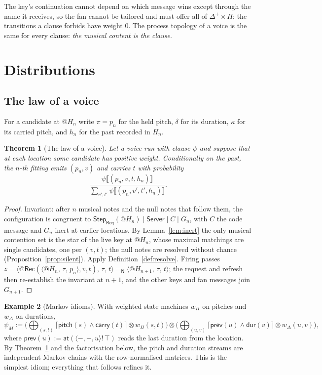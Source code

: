 \documentclass[11pt,a4paper]{article}
\makeatletter
\theoremstyle{plain}
\newtheorem{theorem}{Theorem}[section]
\theoremstyle{definition}
\newtheorem{example}[theorem]{Example}
\theoremstyle{remark}
\newcommand{\nameq}{=_{\mathsf{N}}}
\newcommand{\tensorv}{\otimes}
\newcommand{\crisp}[1]{\lceil #1 \rceil}
\newcommand{\Pit}{\Pi}
\newcommand{\Dur}{\Delta}
\newcommand{\nm}[3]{\langle @#1,\,#2,\,#3\rangle}
\newcommand{\atm}[1]{\mathsf{#1}}
\newcommand{\Rec}{\mathsf{Rec}}
\newcommand{\Server}{\mathsf{Server}}
\newcommand{\Req}{\mathsf{Req}}
\makeatother
\begin{document}
The key's continuation cannot depend on which message wins except through the
name it receives, so the fan cannot be tailored and must offer all of
$\Dur^+\times\Pit$; the transitions a clause forbids have weight $0$. The
process topology of a voice is the same for every clause: \emph{the musical
content is the clause}.

\section{Distributions}\label{sec:dist}

\subsection{The law of a voice}

For a candidate at $@H_n$ write $\pi = p_n$ for the held pitch, $\delta$ for its
duration, $\kappa$ for its carried pitch, and $h_n$ for the past recorded in
$H_n$.

\begin{theorem}[The law of a voice]\label{thm:law}
Let a voice run with clause $\psi$ and suppose that at each location some
candidate has positive weight. Conditionally on the past, the $n$-th fitting
emits $(p_n, v)$ and carries $t$ with probability
\[
\frac{\psi\llbracket (p_n, v, t, h_n)\rrbracket}
     {\sum_{v',t'} \psi\llbracket (p_n, v', t', h_n)\rrbracket} .
\]
\end{theorem}
\begin{proof}
Invariant: after $n$ musical notes and the null notes that follow them, the
configuration is congruent to
$\mathsf{Step}_{\Req}(@H_n) \mid \Server \mid C \mid G_n$, with
$C$ the code message and $G_n$ inert at earlier locations. By
Lemma~\ref{lem:inert} the only musical contention set is the star of the live
key at $@H_n$, whose maximal matchings are single candidates, one per $(v,t)$;
the null notes are resolved without chance (Proposition~\ref{prop:silent}).
Apply Definition~\ref{def:resolve}. Firing passes
$z = \nm{\Rec(\nm{H_n}{\tau}{p_n},v,t)}{\tau}{t} \nameq \nm{H_{n+1}}{\tau}{t}$;
the request and refresh then re-establish the invariant at $n+1$, and the other
keys and fan messages join $G_{n+1}$.
\end{proof}

\begin{example}[Markov idioms]\label{ex:markov}
With weighted state machines $w_\Pit$ on pitches and $w_\Dur$ on durations,
\[
\psi_{M} :=
\Big(\bigoplus_{(s,t)} \crisp{\atm{pitch}(s)\wedge\atm{carry}(t)} \tensorv w_\Pit(s,t)\Big)
\tensorv
\Big(\bigoplus_{(u,v)} \crisp{\atm{prev}(u)\wedge\atm{dur}(v)} \tensorv w_\Dur(u,v)\Big),
\]
where $\atm{prev}(u) := \atm{at}(\langle{-},{-},u\rangle!\,\top)$ reads the last
duration from the location. By Theorem~\ref{thm:law} and the factorisation
below, the pitch and duration streams are independent Markov chains with the
row-normalised matrices. This is the simplest idiom; everything that follows
refines it.
\end{example}
\end{document}
